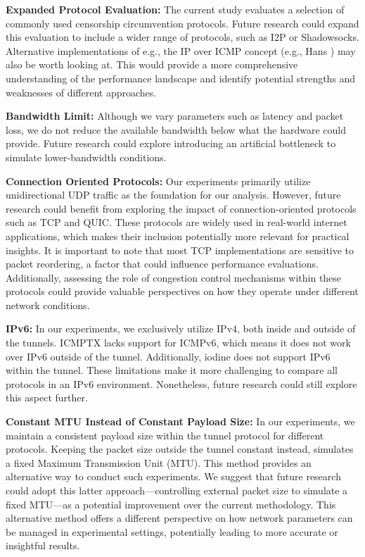 \noindent\textbf{Expanded Protocol Evaluation:}
The current study evaluates a selection of commonly used censorship circumvention protocols.
Future research could expand this evaluation to include a wider range of protocols, such as I2P or Shadowsocks.
Alternative implementations of e.g., the IP over ICMP concept (e.g., Hans \cite{hans}) may also be worth looking at.
This would provide a more comprehensive understanding of the performance landscape and identify potential strengths and weaknesses of different approaches.

\noindent\textbf{Bandwidth Limit:}
Although we vary parameters such as latency and packet loss, we do not reduce the available bandwidth below what the hardware could provide.
Future research could explore introducing an artificial bottleneck to simulate lower-bandwidth conditions.

\noindent\textbf{Connection Oriented Protocols:}
Our experiments primarily utilize unidirectional UDP traffic as the foundation for our analysis.
However, future research could benefit from exploring the impact of connection-oriented protocols such as TCP and QUIC.
These protocols are widely used in real-world internet applications, which makes their inclusion potentially more relevant for practical insights.
It is important to note that most TCP implementations are sensitive to packet reordering, a factor that could influence performance evaluations.
Additionally, assessing the role of congestion control mechanisms within these protocols could provide valuable perspectives on how they operate under different network conditions.

\noindent\textbf{IPv6:}
In our experiments, we exclusively utilize IPv4, both inside and outside of the tunnels.
ICMPTX lacks support for ICMPv6, which means it does not work over IPv6 outside of the tunnel.
Additionally, iodine does not support IPv6 within the tunnel.
These limitations make it more challenging to compare all protocols in an IPv6 environment.
Nonetheless, future research could still explore this aspect further.

\noindent\textbf{Constant MTU Instead of Constant Payload Size:}
In our experiments, we maintain a consistent payload size within the tunnel protocol for different protocols.
Keeping the packet size outside the tunnel constant instead, simulates a fixed Maximum Transmission Unit (MTU).
This method provides an alternative way to conduct such experiments.
We suggest that future research could adopt this latter approach—controlling external packet size to simulate a fixed MTU—as a potential improvement over the current methodology.
This alternative method offers a different perspective on how network parameters can be managed in experimental settings, potentially leading to more accurate or insightful results.

